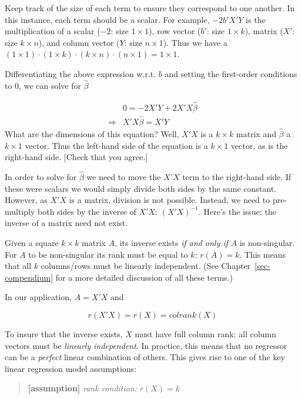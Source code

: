 \documentclass[
  letterpaper,
  DIV=11,
  numbers=noendperiod]{scrreprt}
\begin{document}
Keep track of the size of each term to ensure they correspond to one
another. In this instance, each term should be a scalar. For example,
\(-2b'X'Y\) is the multiplication of a scalar (\(-2\): size
\(1\times 1\)), row vector (\(b'\): size \(1\times k\)), matrix (\(X'\):
size \(k\times n\)), and column vector (\(Y\): size \(n\times 1\)). Thus
we have a
\((1\times 1)\cdot (1\times k)\cdot (k\times n)\cdot (n\times 1)=1\times 1\).

Differentiating the above expression w.r.t. \(b\) and setting the
first-order conditions to \(0\), we can solve for \(\hat{\beta}\)

\[ \begin{align} &0=-2X'Y+2X'X\hat{\beta} \\ \Rightarrow& X'X\hat{\beta} = X'Y \end{align} \]
What are the dimensions of this equation? Well, \(X'X\) is a
\(k\times k\) matrix and \(\hat{\beta}\) a \(k\times 1\) vector. Thus
the left-hand side of the equation is a \(k\times 1\) vector, as is the
right-hand side. {[}Check that you agree.{]}

In order to solve for \(\hat{\beta}\) we need to move the \(X'X\) term
to the right-hand side. If these were scalars we would simply divide
both sides by the same constant. However, as \(X'X\) is a matrix,
division is not possible. Instead, we need to pre-multiply both sides by
the inverse of \(X'X\): \((X'X)^{-1}\). Here's the issue: the inverse of
a matrix need not exist.

Given a square \(k\times k\) matrix \(A\), its inverse exists \emph{if
and only if} \(A\) is non-singular. For \(A\) to be non-singular its
rank must be equal to \(k\): \(r(A)=k\). This means that all \(k\)
columns/rows must be linearly independent. (See
Chapter~\ref{sec-compendium} for a more detailed discussion of all these
terms.)

In our application, \(A=X'X\) and

\[ r(X'X) = r(X) = colrank(X) \]

To insure that the inverse exists, \(X\) must have full column rank: all
column vectors must be \emph{linearly independent}. In practice, this
means that no regressor can be a \emph{perfect} linear combination of
others. This gives rise to one of the key linear regression model
assumptions:

\begin{quote}
\textbf{{[}assumption{]}} \emph{rank condition:} \(r(X)=k\)
\end{quote}
\end{document}
